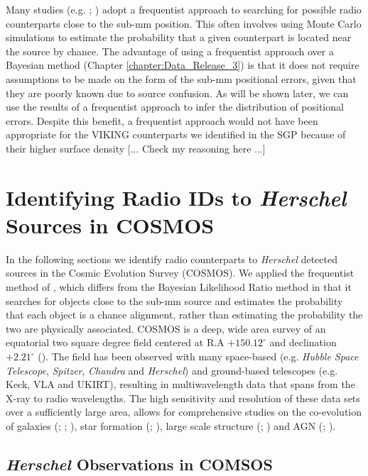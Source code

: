 Many studies (e.g. \citealt{Eales_2009}; \citealt{Dye_2009}) adopt a frequentist approach to searching for possible radio counterparts close to the sub-mm position. This often involves using Monte Carlo simulations to estimate the probability that a given counterpart is located near the source by chance. The advantage of using a frequentist approach over a Bayesian method (Chapter \ref{chapter:Data_Release_3}) is that it does not require assumptions to be made on the form of the sub-mm positional errors, given that they are poorly known due to source confusion. As will be shown later, we can use the results of a frequentist approach to infer the distribution of positional errors. Despite this benefit, a frequentist approach would not have been appropriate for the VIKING counterparts we identified in the SGP because of their higher surface density {\color{red}[... Check my reasoning here ...]} 

\section{Identifying Radio IDs to \textit{Herschel} Sources in COSMOS}

In the following sections we identify radio counterparts to \textit{Herschel} detected sources in the Cosmic Evolution Survey (COSMOS). We applied the frequentist method of \citealt{Lilly_1999}, which differs from the Bayesian Likelihood Ratio method in that it searches for objects close to the sub-mm source and estimates the probability that each object is a chance alignment, rather than estimating the probability the two are physically associated. COSMOS is a deep, wide area survey of an equatorial two square degree field centered at R.A $+150.12^{\circ}$ and declination $+2.21^{\circ}$ (\citealt{Scoville_2007}). The field has been observed with many space-based (e.g. \textit{Hubble Space Telescope}, \textit{Spitzer}, \textit{Chandra} and \textit{Herschel}) and ground-based telescopes (e.g. Keck, VLA and UKIRT), resulting in multiwavelength data that spans from the X-ray to radio wavelengths. The high sensitivity and resolution of these data sets over a sufficiently large area, allows for comprehensive studies on the co-evolution of galaxies (\citealt{Schreiber_2018}; \citealt{Stockmann_2020}; \citealt{Valentino_2020}), star formation (\citealt{Gruppioni_2013}; \citealt{Novak_2017}), large scale structure (\citealt{Scoville_2013}; \citealt{Laigle_2018}) and AGN (\citealt{Prescott_2006}; \citealt{Heintz_2016}). 

\subsection{\textit{Herschel} Observations in COMSOS}

